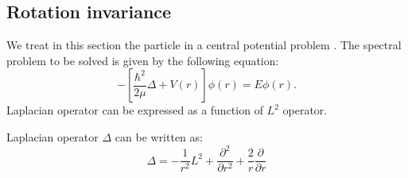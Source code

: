 \documentclass[12pt]{book}
\begin{document}
\subsection{Rotation invariance}\label{secpotcent}
We treat in this section the particle in a central potential problem
\cite{ph:mecaq:Cohen73,ma:equad:Dautray5,ph:elect:Jackson75}. The spectral
problem to be solved is given by the following equation:
\begin{equation}
-[\frac{\hbar^2}{2\mu}\Delta+V(r)]\phi(r)=E\phi(r).
\end{equation}
Laplacian operator can be expressed as a function of $L^2$ operator.
\begin{thm}
Laplacian operator $\Delta$ can be written as:
\begin{equation}
\Delta=-\frac{1}{r^2}L^2+\frac{\partial^2}{\partial
r^2}+\frac{2}{r}\frac{\partial}{\partial r}
\end{equation}
\end{thm}
\end{document}

